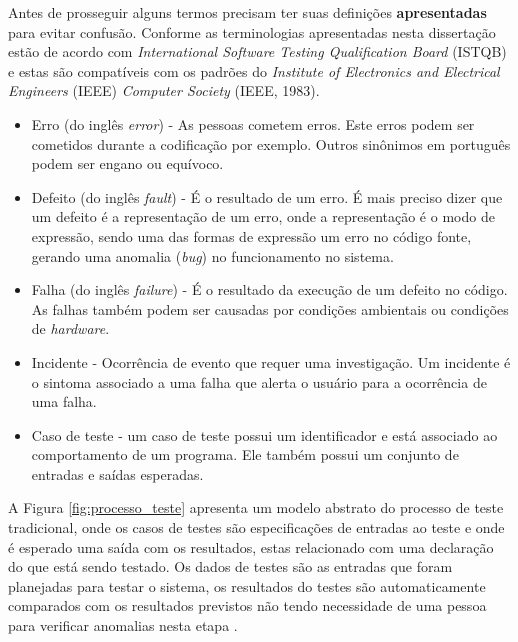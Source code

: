 \documentclass[dm,ppgcomp]{texfurg} %
\begin{document}
Antes de prosseguir alguns termos precisam ter suas definições \textbf{apresentadas} para evitar confusão. Conforme \cite{jorgensen2016software} as terminologias apresentadas nesta dissertação estão de acordo com \textit{International Software Testing Qualification Board} (ISTQB) e estas são compatíveis com os padrões do \textit{Institute of Electronics and Electrical Engineers} (IEEE) \textit{Computer Society} (IEEE, 1983).

\begin{itemize}
\item Erro (do inglês \textit{error}) - As pessoas cometem erros. Este erros podem ser cometidos durante a codificação por exemplo. Outros sinônimos em português podem ser engano ou equívoco.
\item Defeito (do inglês \textit{fault}) -  É o resultado de um erro. É mais preciso dizer que um defeito é a representação de um erro, onde a representação é o modo de expressão, sendo uma das formas de expressão um erro no código fonte, gerando uma anomalia (\textit{bug}) no funcionamento no sistema.
\item Falha (do inglês \textit{failure}) - É o resultado da execução de um defeito no código. As falhas também podem ser causadas por condições ambientais ou condições de \textit{hardware}.
\item Incidente - Ocorrência de evento que requer uma investigação. Um incidente é o sintoma associado a uma falha que alerta o usuário para a ocorrência de uma falha.
\item Caso de teste - um caso de teste possui um identificador e está associado ao comportamento de um programa. Ele também possui um conjunto de entradas e saídas esperadas.
\end{itemize}

A Figura \ref{fig:processo_teste} apresenta um modelo abstrato do processo de teste tradicional, onde os casos de testes são especificações de entradas ao teste e onde é esperado uma saída com os resultados, estas relacionado com uma declaração do que está sendo testado. Os dados de testes são as entradas que foram planejadas para testar o sistema, os resultados do testes são automaticamente comparados com os resultados previstos não tendo necessidade de uma pessoa para verificar anomalias nesta etapa \cite{sommerville2010}.
\end{document}
